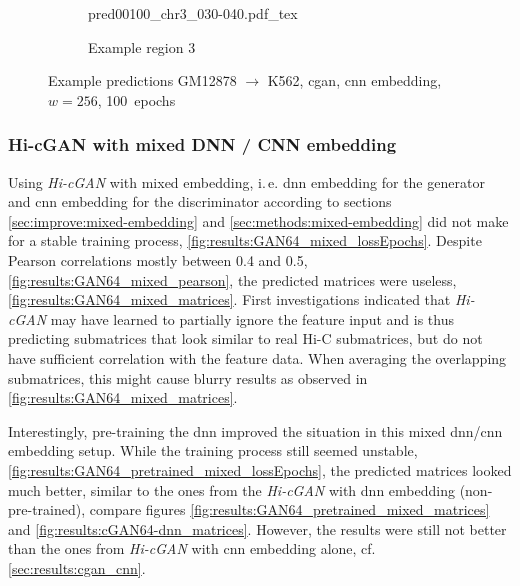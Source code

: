 \begin{figure}\ContinuedFloat
    \begin{subfigure}{\textwidth}
        \centering
        \scriptsize
        {pred00100_chr3_030-040.pdf_tex}
        \caption{Example region 3} \label{fig:results:cGAN256_r3}
    \end{subfigure}
    \caption{Example predictions GM12878 $\rightarrow$ K562, \acrshort{cgan}, \acrshort{cnn} embedding, $w=256$, 100~epochs} \label{fig:results:cGAN256_matrices}
\end{figure}

\subsubsection{Hi-cGAN with mixed DNN / CNN embedding} \label{sec:results:cgan-mixed}
Using \emph{Hi-cGAN} with mixed embedding, i.\,e. \acrshort{dnn} embedding for the generator
and \acrshort{cnn} embedding for the discriminator according to sections \ref{sec:improve:mixed-embedding} and \ref{sec:methods:mixed-embedding} 
did not make for a stable training process, \cref{fig:results:GAN64_mixed_lossEpochs}.
Despite Pearson correlations mostly between 0.4 and 0.5,  \cref{fig:results:GAN64_mixed_pearson}, the predicted matrices were useless, \cref{fig:results:GAN64_mixed_matrices}.
First investigations indicated that \emph{Hi-cGAN} may have learned to partially ignore the feature input 
and is thus predicting submatrices that look similar to real Hi-C submatrices, but do not have sufficient correlation with the feature data.
When averaging the overlapping submatrices, this might cause blurry results as observed in \cref{fig:results:GAN64_mixed_matrices}.

Interestingly, pre-training the \acrshort{dnn} improved the situation in this mixed \acrshort{dnn}/\acrshort{cnn} embedding setup. 
While the training process still seemed unstable, \cref{fig:results:GAN64_pretrained_mixed_lossEpochs},
the predicted matrices looked much better, similar to the ones from the \emph{Hi-cGAN} with \acrshort{dnn} embedding (non-pre-trained),
compare figures \ref{fig:results:GAN64_pretrained_mixed_matrices} and \ref{fig:results:cGAN64-dnn_matrices}.
However, the results were still not better than the ones from \emph{Hi-cGAN} with \acrshort{cnn} embedding alone, cf. \cref{sec:results:cgan_cnn}.

